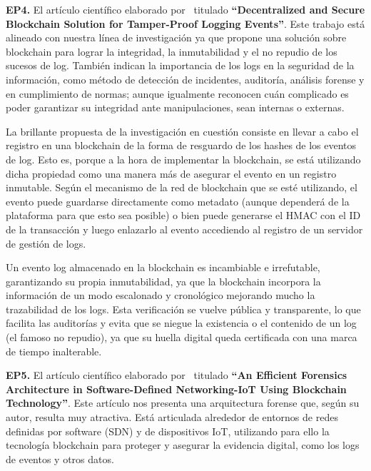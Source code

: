 \textbf{EP4.}  El artículo científico elaborado por~\cite{MorilloReina2025Decentralized}  titulado \textbf{“Decentralized and Secure Blockchain Solution for Tamper-Proof Logging Events”}. Este trabajo está alineado con nuestra línea de investigación ya que propone una solución sobre blockchain para lograr la integridad, la inmutabilidad y el no repudio de los sucesos de log. También indican la importancia de los logs en la seguridad de la información, como método de detección de incidentes, auditoría, análisis forense y en cumplimiento de normas; aunque igualmente reconocen cuán complicado es poder garantizar su integridad ante manipulaciones, sean internas o externas.

La brillante propuesta de la investigación en cuestión consiste en llevar a cabo el registro en una blockchain de la forma de resguardo de los hashes de los eventos de log. Esto es, porque a la hora de implementar la blockchain, se está utilizando dicha propiedad como una manera más de asegurar el evento en un registro inmutable. Según el mecanismo de la red de blockchain que se esté utilizando, el evento puede guardarse directamente como metadato (aunque dependerá de la plataforma para que esto sea posible) o bien puede generarse el HMAC con el ID de la transacción y luego enlazarlo al evento accediendo al registro de un servidor de gestión de logs.

Un evento log almacenado en la blockchain es incambiable e irrefutable, garantizando su propia inmutabilidad, ya que la blockchain incorpora la información de un modo escalonado y cronológico mejorando mucho la trazabilidad de los logs. Esta verificación se vuelve pública y transparente, lo que facilita las auditorías y evita que se niegue la existencia o el contenido de un log (el famoso no repudio), ya que su huella digital queda certificada con una marca de tiempo inalterable.

\textbf{EP5.}  El artículo científico elaborado por~\cite{Pourvahab2019Efficient}  titulado \textbf{“An Efficient Forensics Architecture in Software-Defined Networking-IoT Using Blockchain Technology”}. Este artículo nos presenta una arquitectura forense que, según su autor, resulta muy atractiva. Está articulada alrededor de entornos de redes definidas por software (SDN) y de dispositivos IoT, utilizando para ello la tecnología blockchain para proteger y asegurar la evidencia digital, como los logs de eventos y otros datos.

